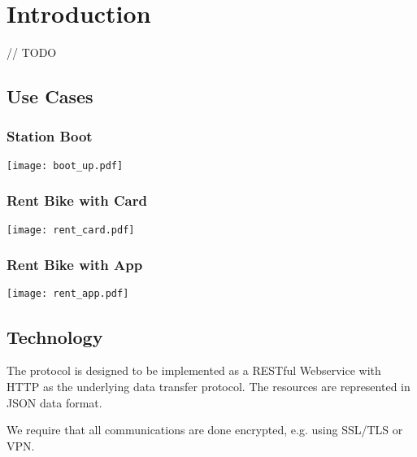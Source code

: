 \section{Introduction}

// TODO


\subsection{Use Cases}

\subsubsection{Station Boot}

\texttt{[image: boot\_up.pdf]}

\subsubsection{Rent Bike with Card}

\texttt{[image: rent\_card.pdf]}

\subsubsection{Rent Bike with App}

\texttt{[image: rent\_app.pdf]}


\subsection{Technology}

The protocol is designed to be implemented as a RESTful Webservice with HTTP as the underlying data transfer protocol. The resources are represented in JSON data format.

We require that all communications are done encrypted, e.g. using SSL/TLS or VPN.
